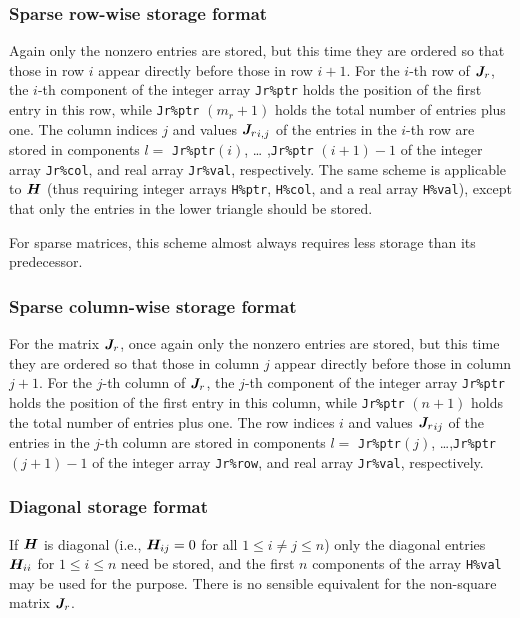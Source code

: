 \documentclass{galahad}
\begin{document}

\subsubsection{Sparse row-wise storage format}\label{rowwise}
Again only the nonzero entries are stored, but this time they are
ordered so that those in row $i$ appear directly before those in row
$i+1$. For the $i$-th row of ${\bm{J}}_r$, the $i$-th component of the integer
array {\tt Jr\%ptr} holds the position of the first entry in this row,
while {\tt Jr\%ptr} $(m_r+1)$ holds the total number of entries plus one.
The column indices $j$ and values ${{\bm{J}}_r}_{i,j}$ of the entries in the
$i$-th row are stored in components $l =$ {\tt Jr\%ptr}$(i)$, \ldots
,{\tt Jr\%ptr} $(i+1)-1$ of the integer array {\tt Jr\%col}, and real
array {\tt Jr\%val}, respectively.
The same scheme is applicable to
${\bm{H}}$ (thus requiring integer arrays {\tt H\%ptr}, {\tt H\%col}, and
a real array {\tt H\%val}),
except that only the entries in the lower triangle should be stored.

For sparse matrices, this scheme almost always requires less storage than
its predecessor.

\subsubsection{Sparse column-wise storage format}\label{columnwise}
For the matrix ${\bm{J}}_r$, once again only the nonzero entries are
stored, but this time they are ordered so that those in column $j$ appear
directly before those in column $j+1$. For the $j$-th column of ${\bm{J}}_r$, the
$j$-th component of the integer array {\tt Jr\%ptr} holds the position of the
first entry in this column, while {\tt Jr\%ptr} $(n+1)$ holds the total number
of entries plus one.  The row indices $i$ and values ${{\bm{J}}_r}_{ij}$ of the
entries in the $j$-th column are stored in components $l =$ 
{\tt Jr\%ptr}$(j)$, \ldots ,{\tt Jr\%ptr} $(j+1)-1$ of the integer array
{\tt Jr\%row}, and real array {\tt Jr\%val}, respectively.

\subsubsection{Diagonal storage format}\label{diagonal}
If ${\bm{H}}$ is diagonal (i.e., ${\bm{H}}_{ij} = 0$ for all $1 \leq i \neq j \leq n$)
only the diagonal entries ${\bm{H}}_{ii}$ for $1 \leq i \leq n$ need be stored,
and the first $n$ components of the array {\tt H\%val} may be used for
the purpose. There is no sensible equivalent for the non-square
matrix ${\bm{J}}_r$.
\end{document}
